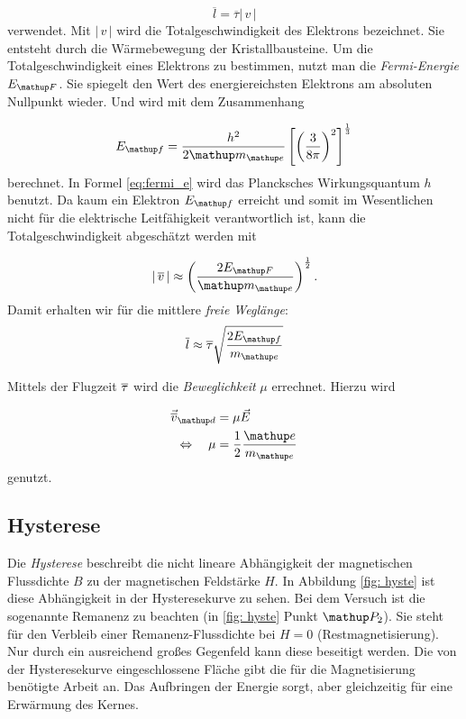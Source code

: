\begin{equation*}
\label{eq:freie_weg}
\overline{l}=\overline{\tau}\left|\,v\,\right|
\end{equation*}
verwendet.
Mit $\left|\,v\,\right|$ wird die Totalgeschwindigkeit des Elektrons bezeichnet.
Sie entsteht durch die Wärmebewegung der Kristallbausteine.
Um die Totalgeschwindigkeit eines Elektrons zu bestimmen, nutzt
man die \emph{Fermi-Energie} $E\ua{F}$. Sie spiegelt den Wert des energiereichsten Elektrons am absoluten Nullpunkt wieder.
Und wird mit dem Zusammenhang %

\begin{equation}
\label{eq:fermi_e}
E\ua{f}=\frac{h^2}{2\map{m}\ua{e}}\left[\left(\frac{3}{8\pi}\right)^2\right]^{\frac{1}{3}}
\end{equation}
berechnet. In Formel \eqref{eq:fermi_e} wird das Plancksches Wirkungsquantum $h$ benutzt.
Da kaum ein Elektron $E\ua{f}$ erreicht und somit im Wesentlichen nicht
für die elektrische Leitfähigkeit verantwortlich ist, %
kann die Totalgeschwindigkeit abgeschätzt werden mit %

\begin{equation}
\label{eq:total_v}
\left|\,\overline{v}\,\right|\approx\left(\frac{2E\ua{F}}{\map{m}\ua{e}}\right)^{\frac{1}{2}}.
\end{equation}
Damit erhalten wir für die  mittlere \emph{freie Weglänge}:
\begin{equation}
\label{eq:mit_frei_weg}
\overline{l}\approx\overline{\tau}\sqrt{\frac{2E\ua{f}}{m\ua{e}}}
\end{equation}

Mittels der Flugzeit $\overline{\tau}$ wird die \emph{Beweglichkeit} $\mu$ errechnet.
Hierzu wird  %

\begin{align}
\vec{\ov{v}}\ua{d}&=\mu\vec{E} \notag \\
\Leftrightarrow \quad \mu&=\frac{1}{2}\frac{\map{e}}{m\ua{e}} \label{eq:beweg}
\end{align}
genutzt.

\subsection{Hysterese}

Die \emph{Hysterese} beschreibt die nicht lineare
Abhängigkeit der magnetischen Flussdichte $B$ zu der
magnetischen Feldstärke $H$. In Abbildung \ref{fig: hyste} ist
diese Abhängigkeit in der Hysteresekurve zu sehen.
Bei dem Versuch ist die sogenannte Remanenz zu beachten (in \ref{fig: hyste} Punkt $\map{P}_2$). %
Sie steht für den Verbleib einer Remanenz-Flussdichte bei $H=0$ (Restmagnetisierung). %
Nur durch ein ausreichend großes Gegenfeld kann diese beseitigt werden. %
Die von der Hysteresekurve eingeschlossene Fläche gibt die für die Magnetisierung benötigte
Arbeit an. Das Aufbringen der Energie sorgt, aber gleichzeitig für eine Erwärmung des Kernes. %

